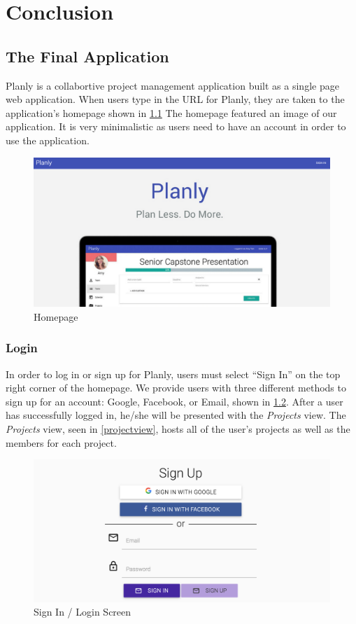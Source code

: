\chapter{Conclusion}

\section{The Final Application}
Planly is a collabortive project management application built as a single page web application. When users type in the URL for Planly, they are taken to the application's homepage shown in \ref{homepage} The homepage featured an image of our application. It is very minimalistic as users need to have an account in order to use the application.

\begin{figure}[ht]
\centering
\includegraphics[width=\textwidth]{figure41.png}
\caption{Homepage}
\label{homepage}
\end{figure}
\FloatBarrier

\subsection{Login}
In order to log in or sign up for Planly, users must select ``Sign In'' on the top right corner of the homepage. We provide users with three different methods to sign up for an account: Google, Facebook, or Email, shown in \ref{signin}. After a user has successfully logged in, he/she will be presented with the \emph{Projects} view. The \emph{Projects} view, seen in \ref{projectview}, hosts all of the user's projects as well as the members for each project. 

\begin{figure}[ht]
\centering
\includegraphics[width=\textwidth]{figure42.png}
\caption{Sign In / Login Screen}
\label{signin}
\end{figure}
\FloatBarrier

